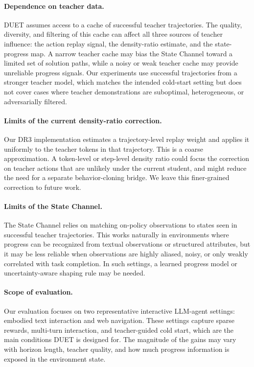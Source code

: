 \paragraph{Dependence on teacher data.}
DUET assumes access to a cache of successful teacher trajectories.
The quality, diversity, and filtering of this cache can affect all three sources of teacher influence: the action replay signal, the density-ratio estimate, and the state-progress map.
A narrow teacher cache may bias the State Channel toward a limited set of solution paths, while a noisy or weak teacher cache may provide unreliable progress signals.
Our experiments use successful trajectories from a stronger teacher model, which matches the intended cold-start setting but does not cover cases where teacher demonstrations are suboptimal, heterogeneous, or adversarially filtered.

\paragraph{Limits of the current density-ratio correction.}
Our DR3 implementation estimates a trajectory-level replay weight and applies it uniformly to the teacher tokens in that trajectory.
This is a coarse approximation.
A token-level or step-level density ratio could focus the correction on teacher actions that are unlikely under the current student, and might reduce the need for a separate behavior-cloning bridge.
We leave this finer-grained correction to future work.

\paragraph{Limits of the State Channel.}
The State Channel relies on matching on-policy observations to states seen in successful teacher trajectories.
This works naturally in environments where progress can be recognized from textual observations or structured attributes, but it may be less reliable when observations are highly aliased, noisy, or only weakly correlated with task completion.
In such settings, a learned progress model or uncertainty-aware shaping rule may be needed.

\paragraph{Scope of evaluation.}
Our evaluation focuses on two representative interactive LLM-agent settings: embodied text interaction and web navigation. 
These settings capture sparse rewards, multi-turn interaction, and teacher-guided cold start, which are the main conditions DUET is designed for. 
The magnitude of the gains may vary with horizon length, teacher quality, and how much progress information is exposed in the environment state.